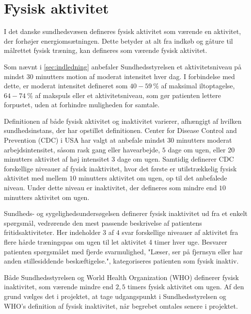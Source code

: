 \section{Fysisk aktivitet}

I det danske sundhedsvæsen defineres fysisk aktivitet som værende en aktivitet, der forhøjer energiomsætningen. Dette betyder at alt fra indkøb og gåture til målrettet fysisk træning, kan defineres som værende fysisk aktivitet\citep{motionsraad2007, terkelsen2015}.

Som nævnt i \ref{sec:indledning} anbefaler Sundhedsstyrelsen et aktivitetsniveau på mindst 30 minutters motion af moderat intensitet hver dag. I forbindelse med dette, er moderat intensitet defineret som $40-59~\%$ af maksimal iltoptagelse, $64-74~\%$ af makspuls eller et aktivitetsniveau, som gør patienten lettere forpustet, uden at forhindre muligheden for samtale\citep{motionsraad2007}. 

Definitionen af både fysisk aktivitet og inaktivitet varierer, afhængigt af hvilken sundhedsinstans, der har opstillet definitionen. Center for Disease Control and Prevention (CDC) i USA har valgt at anbefale mindst $30$ minutters moderat arbejdsintensitet, såsom rask gang eller havearbejde, $5$ dage om ugen, eller 20 minutters aktivitet af høj intensitet 3 dage om ugen. Samtidig definerer CDC forskellige niveauer af fysisk inaktivitet, hvor det første er utilstrækkelig fysisk aktivitet med mellem $10$ minutters aktivitet om ugen, op til det anbefalede niveau. Under dette niveau er inaktivitet, der defineres som mindre end $10$ minutters aktivitet om ugen\citep{motionsraad2007}.

Sundheds- og sygelighedsundersøgelsen definerer fysisk inaktivitet ud fra et enkelt spørgsmål, vedrørende den mest passende beskrivelse af patientens fritidsaktiviteter. Her indeholder $3$ af $4$ svar forskellige niveauer af aktivitet fra flere hårde træningspas om ugen til let aktivitet 4 timer hver uge. Besvarer patienten spørgsmålet med fjerde svarmulighed, "Læser, ser på fjernsyn eller har anden stillesiddende beskæftigelse.", kategoriseres patienten som fysisk inaktiv\citep{motionsraad2007}.

Både Sundhedsstyrelsen og World Health Organization (WHO) definerer fysisk inaktivitet, som værende mindre end $2,5$ timers fysisk aktivitet om ugen. Af den grund vælges det i projektet, at tage udgangspunkt i Sundhedsstyrelsen og WHO's definition af fysisk inaktivitet, når begrebet omtales senere i projektet\citep{motionsraad2007}.